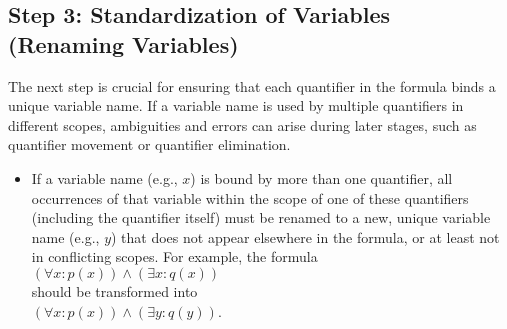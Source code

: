 \subsection{Step 3: Standardization of Variables (Renaming Variables)}
The next step is crucial for ensuring that each quantifier in the formula binds a unique variable name. If a
variable name is used by multiple quantifiers in different scopes, ambiguities and errors can arise during
later stages, such as quantifier movement or quantifier elimination. 
\begin{itemize}
\item If a variable name (e.g., $x$) is bound by more than one quantifier, all occurrences of that variable
      within the scope of one of these quantifiers (including the quantifier itself) must be renamed to a new,
      unique variable name (e.g., $y$) that does not appear elsewhere in the formula, or at least not in
      conflicting scopes. For example, the formula
      \\[0.2cm]
      \hspace*{1.3cm}
      $(\forall x: p(x)) \land (\exists x: q(x))$ 
      \\[0.2cm]
      should be transformed into
      \\[0.2cm]
      \hspace*{1.3cm}
      $(\forall x: p(x)) \land (\exists y: q(y))$. 
\end{itemize}

